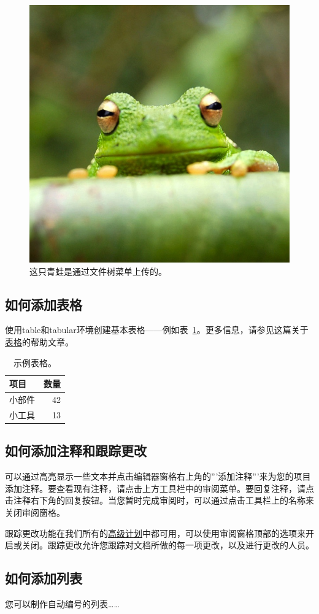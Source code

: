 \documentclass{article}
\begin{document}
\begin{figure}[H]
    \centering
    \includegraphics[width=0.25\linewidth]{frog.jpg}
    \caption{\label{fig:frog}这只青蛙是通过文件树菜单上传的。}
\end{figure}

\subsection{如何添加表格}

使用table和tabular环境创建基本表格——例如表~\ref{tab:widgets}。更多信息，请参见这篇关于\href{https://www.overleaf.com/learn/latex/tables}{表格}的帮助文章。

\begin{table}[H]
    \centering
    \begin{tabular}{l|r}
        项目  & 数量 \\\hline
        小部件 & 42 \\
        小工具 & 13
    \end{tabular}
    \caption{\label{tab:widgets}示例表格。}
\end{table}

\subsection{如何添加注释和跟踪更改}

可以通过高亮显示一些文本并点击编辑器窗格右上角的'''添加注释'''来为您的项目添加注释。要查看现有注释，请点击上方工具栏中的审阅菜单。要回复注释，请点击注释右下角的回复按钮。当您暂时完成审阅时，可以通过点击工具栏上的名称来关闭审阅窗格。

跟踪更改功能在我们所有的\href{https://www.overleaf.com/user/subscription/plans}{高级计划}中都可用，可以使用审阅窗格顶部的选项来开启或关闭。跟踪更改允许您跟踪对文档所做的每一项更改，以及进行更改的人员。

\subsection{如何添加列表}

您可以制作自动编号的列表……
\end{document}
